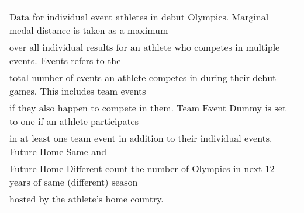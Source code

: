 \begin{table}[!htbp]
\begin{tabular}{@{\extracolsep{5pt}} lccccc}
\hline 
\hline \\[-1.8ex] 
\multicolumn{6}{l}{\footnotesize Data for individual event athletes in debut Olympics. Marginal medal distance is taken as a maximum} \\ 
\multicolumn{6}{l}{\footnotesize over all individual results for an athlete who competes in multiple events. Events refers to the} \\ 
\multicolumn{6}{l}{\footnotesize total number of events an athlete competes in during their debut games. This includes team events} \\ 
\multicolumn{6}{l}{\footnotesize if they also happen to compete in them. Team Event Dummy is set to one if an athlete participates} \\ 
\multicolumn{6}{l}{\footnotesize in at least one team event in addition to their individual events. Future Home Same and} \\ 
\multicolumn{6}{l}{\footnotesize Future Home Different count the number of Olympics in next 12 years of same (different) season} \\ 
\multicolumn{6}{l}{\footnotesize hosted by the athlete's home country.} \\ 
\end{tabular} 
\end{table} 
